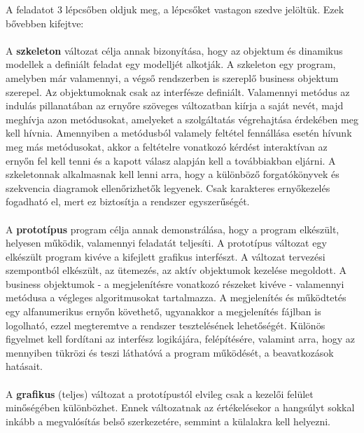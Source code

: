 A feladatot 3 lépcsőben oldjuk meg, a lépcsőket vastagon szedve jelöltük. Ezek bővebben kifejtve: \\ \\
A \textbf{szkeleton} változat célja annak bizonyítása, hogy az objektum és dinamikus modellek a definiált feladat egy modelljét alkotják. A szkeleton egy program, amelyben már valamennyi, a végső rendszerben is szereplő business objektum szerepel. Az objektumoknak csak az interfésze definiált. Valamennyi metódus az indulás pillanatában az ernyőre szöveges változatban kiírja a saját nevét, majd meghívja azon metódusokat, amelyeket a szolgáltatás végrehajtása érdekében meg kell hívnia. Amennyiben a metódusból valamely feltétel fennállása esetén hívunk meg más metódusokat, akkor a feltételre vonatkozó kérdést interaktívan az ernyőn fel kell tenni és a kapott válasz alapján kell a továbbiakban eljárni. A szkeletonnak alkalmasnak kell lenni arra, hogy a különböző forgatókönyvek és szekvencia diagramok ellenőrizhetők legyenek. Csak karakteres ernyőkezelés fogadható el, mert ez biztosítja a rendszer egyszerűségét. \\ \\
A \textbf{prototípus} program célja annak demonstrálása, hogy a program elkészült, helyesen működik, valamennyi feladatát teljesíti. A prototípus változat egy elkészült program kivéve a kifejlett grafikus interfészt. A változat tervezési szempontból elkészült, az ütemezés, az aktív objektumok kezelése megoldott. A business objektumok - a megjelenítésre vonatkozó részeket kivéve - valamennyi metódusa a végleges algoritmusokat tartalmazza. A megjelenítés és működtetés egy alfanumerikus ernyőn követhető, ugyanakkor a megjelenítés fájlban is logolható, ezzel megteremtve a rendszer tesztelésének lehetőségét. Különös figyelmet kell fordítani az interfész logikájára, felépítésére, valamint arra, hogy az mennyiben tükrözi és teszi láthatóvá a program működését, a beavatkozások hatásait. \\ \\
A \textbf{grafikus} (teljes) változat a prototípustól elvileg csak a kezelői felület minőségében különbözhet. Ennek változatnak az értékelésekor a hangsúlyt sokkal inkább a megvalósítás belső szerkezetére, semmint a külalakra kell helyezni. \\ \\



